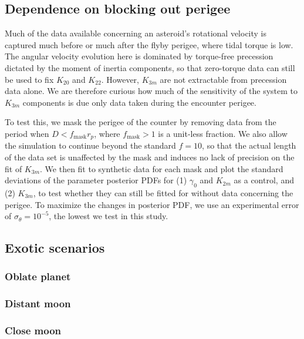 \documentclass{aastex631}
\begin{document}
\subsection{Dependence on blocking out perigee}
\label{sec:block-perigee}
Much of the data available concerning an asteroid's rotational velocity is captured much before or much after the flyby perigee, where tidal torque is low. The angular velocity evolution here is dominated by torque-free precession dictated by the moment of inertia components, so that zero-torque data can still be used to fix $K_{20}$ and $K_{22}$. However, $K_{3m}$ are not extractable from precession data alone. We are therefore curious how much of the sensitivity of the system to $K_{3m}$ components is due only data taken during the encounter perigee.

To test this, we mask the perigee of the counter by removing data from the period when $D < f_\textrm{mask} r_p$, where $f_\textrm{mask}>1$ is a unit-less fraction. We also allow the simulation to continue beyond the standard $f = 10$, so that the actual length of the data set is unaffected by the mask and induces no lack of precision on the fit of $K_{3m}$. We then fit to synthetic data for each mask and plot the standard deviations of the parameter posterior PDFs for (1) $\gamma_0$ and $K_{2m}$ as a control, and (2) $K_{3m}$, to test whether they can still be fitted for without data concerning the perigee. To maximize the changes in posterior PDF, we use an experimental error of $\sigma_\theta = 10^{-5}$, the lowest we test in this study.

\subsection{Exotic scenarios}

\subsubsection{Oblate planet}

\subsubsection{Distant moon}

\subsubsection{Close moon}
\end{document}
